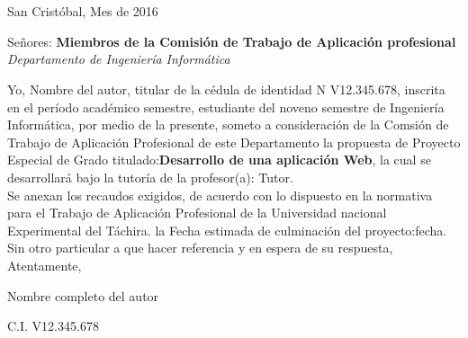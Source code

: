 \chapter*{}
\pagestyle{empty}
\thispagestyle{empty}
\begin{flushright}
San Crist\'obal, Mes de 2016
\end{flushright}


\begin{flushleft}
Se\~nores:
\textbf{Miembros de la Comisi\'on de Trabajo de Aplicaci\'on profesional}
\textit{Departamento de Ingenier\'ia Inform\'atica}
\end{flushleft}



	Yo, Nombre del autor, titular de la c\'edula de identidad N V12.345.678, inscrita en el per\'iodo acad\'emico semestre, estudiante del noveno semestre de Ingenier\'ia Inform\'atica, por medio de la presente, someto a consideraci\'on de la Comsi\'on de Trabajo de Aplicaci\'on Profesional de este Departamento la propuesta de Proyecto Especial de Grado titulado:\textbf{Desarrollo de una aplicaci\'on Web}, la cual se desarrollar\'a bajo la tutor\'ia de la profesor(a): Tutor.\\
	
	
	Se anexan los recaudos exigidos, de acuerdo con lo dispuesto en la normativa para el Trabajo de Aplicaci\'on Profesional de la Universidad nacional Experimental del T\'achira. la Fecha estimada de culminaci\'on del proyecto:fecha.\\
	
	
	Sin otro particular a que hacer referencia y en espera de su respuesta,\\
	
	
	Atentamente,\\
	
	
	\begin{center}
	Nombre completo del autor
	
	C.I. V12.345.678
	\end{center}
	 